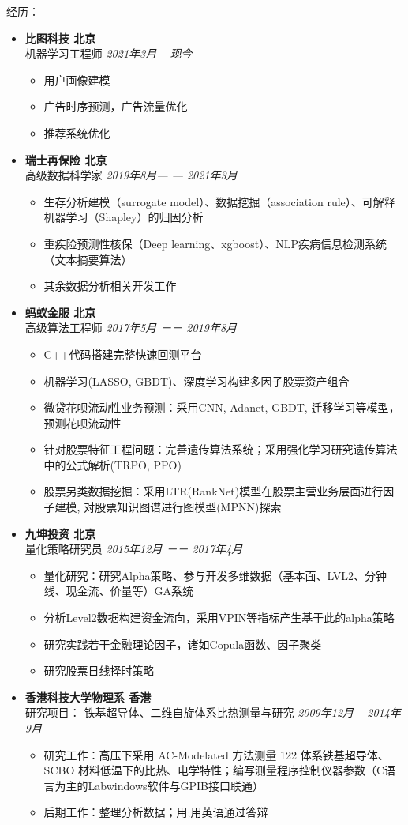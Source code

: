 \documentclass[a4paper,9pt,oneside]{scrartcl}
\newenvironment{ressection}[1]{
    \vspace{2pt}
    {\large#1}
    \begin{itemize}
    \vspace{2pt}
}{
    \end{itemize}
}
\newcommand{\ressubitem}[1]{
    \vspace{0pt}
    \item #1
}
\newcommand{\resbigitem}[3]{
    \vspace{-5pt}
    \item
    \textbf{#1}\\
    #2
    \textit{#3}
}
\newenvironment{ressubsec}[3]{
\resbigitem{#1}{#2}{#3}
    \vspace{-2pt}
    \begin{itemize}
}{
    \end{itemize}
}
\begin{document}
\begin{CJK*}{UTF8}{gbsn}
\begin{ressection}{经历：}
  \begin{ressubsec}{比图科技 \hfill 北京}{机器学习工程师}{\hfill 2021年3月 -- 现今}
	  \ressubitem{用户画像建模}
	  \ressubitem{广告时序预测，广告流量优化}
	  \ressubitem{推荐系统优化}
  \end{ressubsec}
  \begin{ressubsec}{瑞士再保险 \hfill 北京}{高级数据科学家}{\hfill 2019年8月— — 2021年3月}
	  \ressubitem{生存分析建模（surrogate model）、数据挖掘（association rule）、可解释机器学习（Shapley）的归因分析}
	  \ressubitem{重疾险预测性核保（Deep learning、xgboost）、NLP疾病信息检测系统（文本摘要算法）}
	  \ressubitem{其余数据分析相关开发工作}
  \end{ressubsec}
  \begin{ressubsec}{蚂蚁金服 \hfill 北京}{高级算法工程师}{\hfill 2017年5月 －－ 2019年8月}
	  \ressubitem{C++代码搭建完整快速回测平台}
	  \ressubitem{机器学习(LASSO, GBDT)、深度学习构建多因子股票资产组合}
	  \ressubitem{微贷花呗流动性业务预测：采用CNN, Adanet, GBDT, 迁移学习等模型，预测花呗流动性}
	  \ressubitem{针对股票特征工程问题：完善遗传算法系统；采用强化学习研究遗传算法中的公式解析(TRPO, PPO)}
	  \ressubitem{股票另类数据挖掘：采用LTR(RankNet)模型在股票主营业务层面进行因子建模, 对股票知识图谱进行图模型(MPNN)探索}
  \end{ressubsec}
  \begin{ressubsec}{九坤投资 \hfill 北京}{量化策略研究员}{\hfill 2015年12月 －－ 2017年4月}
    \ressubitem{量化研究：研究Alpha策略、参与开发多维数据（基本面、LVL2、分钟线、现金流、价量等）GA系统}
    \ressubitem{分析Level2数据构建资金流向，采用VPIN等指标产生基于此的alpha策略}
    \ressubitem{研究实践若干金融理论因子，诸如Copula函数、因子聚类}
	\ressubitem{研究股票日线择时策略}
  \end{ressubsec}
  \begin{ressubsec}{香港科技大学物理系 \hfill 香港}{研究项目：
    铁基超导体、二维自旋体系比热测量与研究}{\hfill  2009年12月 -- 2014年9月}
    \ressubitem{研究工作：高压下采用 AC-Modelated 方法测量 122 体系铁基超导体、SCBO
        材料低温下的比热、电学特性；编写测量程序控制仪器参数（C语言为主的Labwindows软件与GPIB接口联通）}
    \ressubitem{后期工作：整理分析数据；用;用英语通过答辩}
  \end{ressubsec}
\end{ressection}


\end{CJK*}
\end{document}
